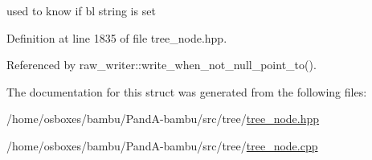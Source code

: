 used to know if bl string is set 



Definition at line 1835 of file tree\+\_\+node.\+hpp.



Referenced by raw\+\_\+writer\+::write\+\_\+when\+\_\+not\+\_\+null\+\_\+point\+\_\+to().



The documentation for this struct was generated from the following files\+:\begin{DoxyCompactItemize}
\item 
/home/osboxes/bambu/\+Pand\+A-\/bambu/src/tree/\hyperlink{tree__node_8hpp}{tree\+\_\+node.\+hpp}\item 
/home/osboxes/bambu/\+Pand\+A-\/bambu/src/tree/\hyperlink{tree__node_8cpp}{tree\+\_\+node.\+cpp}\end{DoxyCompactItemize}
